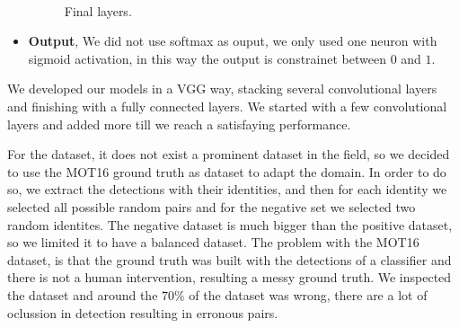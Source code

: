 \documentclass[12pt, a4paper, titlepage,twoside,openright]{article}
\begin{document}
\begin{itemize}
\begin{figure}[H]
\\



\caption{Final layers.}
\label{siameseData2}
\end{figure}


\item \textbf{Output}, We did not use softmax as ouput, we only used one neuron with sigmoid activation, in this way the output is constrainet between $0$ and $1$.



\end{itemize}

  

We developed our models in a VGG way, stacking  several convolutional layers and finishing with a fully connected layers. We started with a few convolutional layers and added more till we reach a satisfaying performance.



For the dataset, it does not exist a prominent dataset in the field, so we decided to use the MOT16 ground truth as dataset to adapt the domain. In order to do so, we extract the detections with their identities, and then for each identity we selected all possible random pairs and for the negative set we selected two random identites. The negative dataset is much bigger than the positive dataset, so we limited it to have a balanced dataset. The problem with the MOT16 dataset, is that the ground truth was built with the detections of a classifier and there is not a human intervention, resulting a messy ground truth. We inspected the dataset and around the $70 \%$ of the dataset was wrong, there are a lot of oclussion in detection resulting in erronous pairs.
\end{document}
